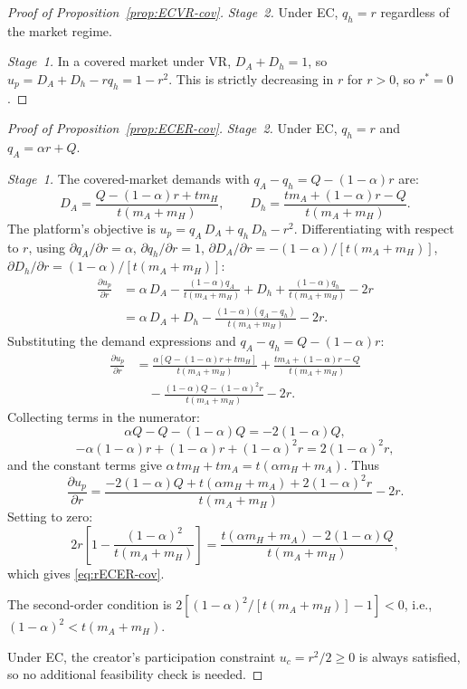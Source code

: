 \documentclass[mnsc,nonblindrev]{informs3_NoOR}
\begin{document}
\begin{proof}[Proof of Proposition~\ref{prop:ECVR-cov}]
\textit{Stage~2.} Under EC, $q_h = r$ regardless of the market regime.
 
\textit{Stage~1.} In a covered market under VR, $D_A + D_h = 1$, so
$u_p = D_A + D_h - r q_h = 1 - r^2$.
This is strictly decreasing in $r$ for $r > 0$, so $r^* = 0$.
\end{proof}
 
\begin{proof}[Proof of Proposition~\ref{prop:ECER-cov}]
\textit{Stage~2.} Under EC, $q_h = r$ and $q_A = \alpha r + Q$.
 
\textit{Stage~1.} The covered-market demands with $q_A - q_h = Q - (1-\alpha)r$ are:
\[
D_A = \frac{Q - (1-\alpha)r + t m_H}{t(m_A+m_H)}, \qquad D_h = \frac{t m_A + (1-\alpha)r - Q}{t(m_A+m_H)}.
\]
The platform's objective is $u_p = q_A\,D_A + q_h\,D_h - r^2$.
Differentiating with respect to $r$, using $\partial q_A/\partial r = \alpha$, $\partial q_h/\partial r = 1$, $\partial D_A/\partial r = -(1-\alpha)/[t(m_A+m_H)]$, $\partial D_h/\partial r = (1-\alpha)/[t(m_A+m_H)]$:
\begin{align*}
\frac{\partial u_p}{\partial r} &= \alpha\,D_A - \frac{(1-\alpha)q_A}{t(m_A+m_H)} + D_h + \frac{(1-\alpha)q_h}{t(m_A+m_H)} - 2r \\[4pt]
&= \alpha\,D_A + D_h - \frac{(1-\alpha)(q_A - q_h)}{t(m_A+m_H)} - 2r.
\end{align*}
Substituting the demand expressions and $q_A - q_h = Q - (1-\alpha)r$:
\begin{align*}
\frac{\partial u_p}{\partial r} &= \frac{\alpha[Q - (1-\alpha)r + t m_H]}{t(m_A+m_H)} + \frac{t m_A + (1-\alpha)r - Q}{t(m_A+m_H)} \\
&\quad - \frac{(1-\alpha)Q - (1-\alpha)^2 r}{t(m_A+m_H)} - 2r.
\end{align*}
Collecting terms in the numerator:
\[
\alpha Q - Q - (1-\alpha)Q = -2(1-\alpha)Q,
\]
\[
-\alpha(1-\alpha)r + (1-\alpha)r + (1-\alpha)^2 r = 2(1-\alpha)^2 r,
\]
and the constant terms give $\alpha\,t m_H + t m_A = t(\alpha m_H + m_A)$. Thus
\[
\frac{\partial u_p}{\partial r} = \frac{-2(1-\alpha)Q + t(\alpha m_H +  m_A) + 2(1-\alpha)^2 r}{t(m_A+m_H)} - 2r.
\]
Setting to zero:
\[
2r\!\left[1 - \frac{(1-\alpha)^2}{t(m_A+m_H)}\right] = \frac{t(\alpha m_H +  m_A) - 2(1-\alpha)Q}{t(m_A+m_H)},
\]
which gives \eqref{eq:rECER-cov}.
 
The second-order condition is $2[(1-\alpha)^2/[t(m_A+m_H)] - 1] < 0$, i.e., $(1-\alpha)^2 < t( m_A +  m_H)$.

Under EC, the creator's participation constraint $u_c = r^2/2 \geq 0$ is always satisfied, so no additional feasibility check is needed.
\end{proof}
 
\end{document}
